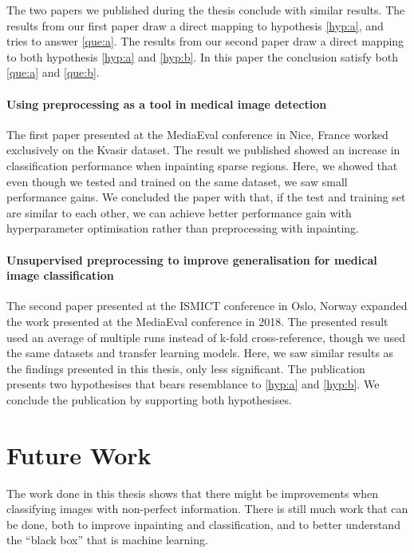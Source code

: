The two papers we published during the thesis conclude with similar results. The results from our first paper draw a direct mapping to hypothesis \ref{hyp:a}, and tries to answer \ref{que:a}. The results from our second paper draw a direct mapping to both hypothesis \ref{hyp:a} and \ref{hyp:b}. In this paper the conclusion satisfy both \ref{que:a} and \ref{que:b}. 


\paragraph{Using preprocessing as a tool in medical image detection~\cite{26254}}
The first paper presented at the MediaEval conference in Nice, France worked exclusively on the Kvasir dataset. The result we published showed an increase in classification performance when inpainting sparse regions. 
Here, we showed that even though we tested and trained on the same dataset, we saw small performance gains. We concluded the paper with that, if the test and training set are similar to each other, we can achieve better performance gain with hyperparameter optimisation rather than preprocessing with inpainting. 

\paragraph{Unsupervised preprocessing to improve generalisation for medical image classification~\cite{Mathias2019IEEpaper}}
The second paper presented at the ISMICT conference in Oslo, Norway expanded the work presented at the MediaEval conference in 2018.
The presented result used an average of multiple runs instead of k-fold cross-reference, though we used the same datasets and transfer learning models.
Here, we saw similar results as the findings presented in this thesis, only less significant. The publication presents two hypothesises that bears resemblance to \ref{hyp:a} and \ref{hyp:b}. We conclude the publication by supporting both hypothesises.




\section{Future Work}
The work done in this thesis shows that there might be improvements when classifying images with non-perfect information. There is still much work that can be done, both to improve inpainting and classification, and to better understand the ``black box'' that is machine learning. 

